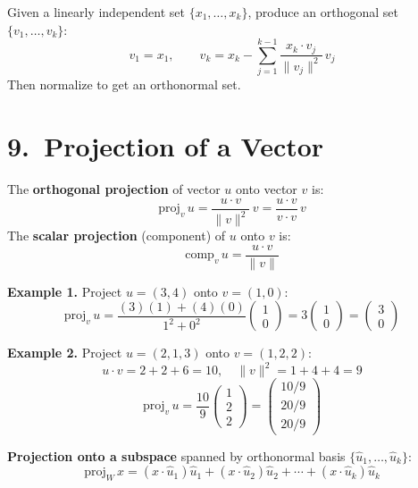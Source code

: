 \documentclass[12pt]{article}
\begin{document}
\begin{thmbox}
Given a linearly independent set $\{x_1,\ldots,x_k\}$, produce an orthogonal set $\{v_1,\ldots,v_k\}$:
\[
v_1 = x_1, \qquad v_k = x_k - \sum_{j=1}^{k-1}\frac{x_k\cdot v_j}{\|v_j\|^2}\,v_j
\]
Then normalize to get an orthonormal set.
\end{thmbox}

\section{9.\ Projection of a Vector}

\begin{defbox}[Projection]
The \textbf{orthogonal projection} of vector $u$ onto vector $v$ is:
\[
\text{proj}_v\,u = \frac{u\cdot v}{\|v\|^2}\,v = \frac{u\cdot v}{v\cdot v}\,v
\]
The \textbf{scalar projection} (component) of $u$ onto $v$ is:
\[
\text{comp}_v\,u = \frac{u\cdot v}{\|v\|}
\]
\end{defbox}

\textbf{Example 1.} Project $u = (3,4)$ onto $v = (1,0)$:
\[
\text{proj}_v\,u = \frac{(3)(1)+(4)(0)}{1^2+0^2}\begin{pmatrix}1\\0\end{pmatrix} = 3\begin{pmatrix}1\\0\end{pmatrix} = \begin{pmatrix}3\\0\end{pmatrix}
\]

\textbf{Example 2.} Project $u = (2,1,3)$ onto $v = (1,2,2)$:
\[
u\cdot v = 2+2+6=10, \quad \|v\|^2 = 1+4+4=9
\]
\[
\text{proj}_v\,u = \frac{10}{9}\begin{pmatrix}1\\2\\2\end{pmatrix} = \begin{pmatrix}10/9\\20/9\\20/9\end{pmatrix}
\]

\begin{keybox}
\textbf{Projection onto a subspace} spanned by orthonormal basis $\{\hat{u}_1,\ldots,\hat{u}_k\}$:
\[
\text{proj}_W\,x = (x\cdot\hat{u}_1)\hat{u}_1 + (x\cdot\hat{u}_2)\hat{u}_2 + \cdots + (x\cdot\hat{u}_k)\hat{u}_k
\]
\end{keybox}
\end{document}
